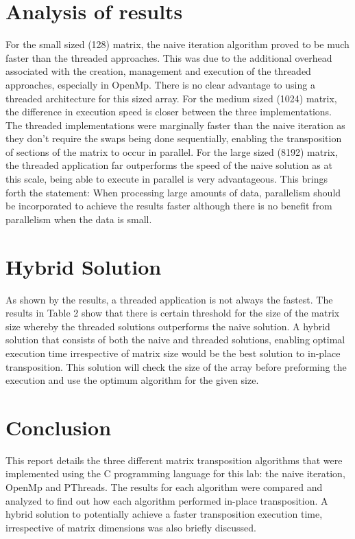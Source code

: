 \documentclass[10pt,onecolumn]{article}
\begin{document}
\section{Analysis of results}
For the small sized (128) matrix, the naive iteration algorithm proved to be much faster than the threaded approaches. This was due to the additional overhead associated with the creation, management and execution of the threaded approaches, especially in OpenMp. There is no clear advantage to using a threaded architecture for this sized array. For the medium sized (1024) matrix, the difference in execution speed is closer between the three implementations. The threaded implementations were marginally faster than the naive iteration as they don’t require the swaps being done sequentially, enabling the transposition of sections of the matrix to occur in parallel. For the large sized (8192) matrix, the threaded application far outperforms the speed of the naive solution as at this scale, being able to execute in parallel is very advantageous. This brings forth the statement: When processing large amounts of data, parallelism should be incorporated to achieve the results faster although there is no benefit from parallelism when the data is small.\\

\section{Hybrid Solution}
As shown by the results, a threaded application is not always the fastest. The results in Table 2 show that there is certain threshold for the size of the matrix size whereby the threaded solutions outperforms the naive solution. A hybrid solution that consists of both the naive and threaded solutions, enabling optimal execution time irrespective of matrix size would be the best solution to in-place transposition. This solution will check the size of the array before preforming the execution and use the optimum algorithm for the given size.

\section{Conclusion}
This report details the three different matrix transposition algorithms that were implemented using the C programming language for this lab: the naive iteration, OpenMp and PThreads. The results for each algorithm were compared and analyzed to find out how each algorithm performed in-place transposition. A hybrid solution to potentially achieve a faster transposition execution time, irrespective of matrix dimensions was also briefly discussed.
\end{document}
